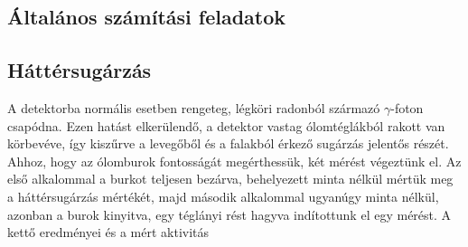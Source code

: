 \begin{multicols}{2}
\section{Általános számítási feladatok}
\subsection{Háttérsugárzás}
A detektorba normális esetben rengeteg, légköri radonból származó $\gamma$-foton csapódna. Ezen hatást elkerülendő, a detektor vastag ólomtéglákból rakott  van körbevéve, így kiszűrve a levegőből  és a falakból érkező sugárzás jelentős részét. Ahhoz, hogy az ólomburok fontosságát megérthessük, két mérést végeztünk el. Az első alkalommal a burkot teljesen bezárva, behelyezett minta nélkül mértük meg a háttérsugárzás mértékét, majd második alkalommal ugyanúgy minta nélkül, azonban a burok  kinyitva, egy téglányi rést hagyva indítottunk el egy mérést. A kettő eredményei és a mért aktivitás 

\end{multicols}